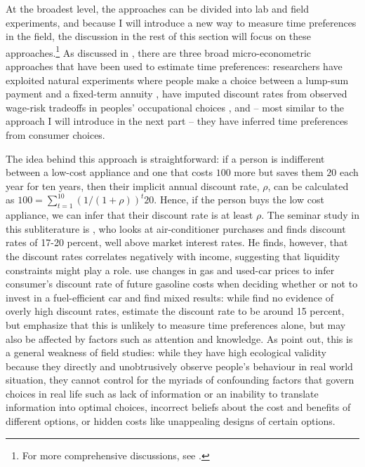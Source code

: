 \documentclass[a4paper, 11pt]{report}
\begin{document}
At the broadest level, the approaches can be divided into lab and field experiments, and because I will introduce a new way to measure time preferences in the field, the discussion in the rest of this section will focus on these approaches.\footnote{For more comprehensive discussions, see \citet{frederick2002time,cohenFmeasuring}.} As discussed in \citet{frederick2002time,cohenFmeasuring}, there are three broad micro-econometric approaches that have been used to estimate time preferences: researchers have exploited natural experiments where people make a choice between a lump-sum payment and a fixed-term annuity \citep{warner2001personal}, have imputed discount rates from observed wage-risk tradeoffs in peoples' occupational choices \citet{moore1990models}, and -- most similar to the approach I will introduce in the next part -- they have inferred time preferences from consumer choices.

The idea behind this approach is straightforward: if a person is indifferent between a low-cost appliance and one that costs $100$ more but saves them $20$ each year for ten years, then their implicit annual discount rate, $\rho$, can be calculated as $100 = \sum^{10}_{t=1} (1 / (1 + \rho))^{t}20$. Hence, if the person buys the low cost appliance, we can infer that their discount rate is at least $\rho$. The seminar study in this subliterature is \citet{hausman1979individual}, who looks at air-conditioner purchases and finds discount rates of 17-20 percent, well above market interest rates. He finds, however, that the discount rates correlates negatively with income, suggesting that liquidity constraints might play a role. \citet{busse2013consumers,allcott2014gasoline} use changes in gas and used-car prices to infer consumer's discount rate of future gasoline costs when deciding whether or not to invest in a fuel-efficient car and find mixed results: while \citet{busse2013consumers} find no evidence of overly high discount rates, \citet{allcott2014gasoline} estimate the discount rate to be around 15 percent, but emphasize that this is unlikely to measure time preferences alone, but may also be affected by factors such as attention and knowledge. As \citet{frederick2002time} point out, this is a general weakness of field studies: while they have high ecological validity because they directly and unobtrusively observe people's behaviour in real world situation, they cannot control for the myriads of confounding factors that govern choices in real life such as lack of information or an inability to translate information into optimal choices, incorrect beliefs about the cost and benefits of different options, or hidden costs like unappealing designs of certain options.
\end{document}
